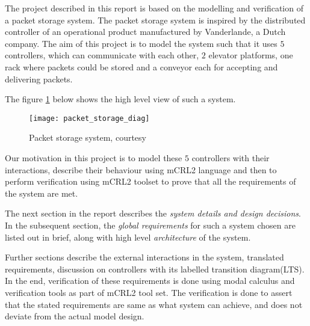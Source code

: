 
The project described in this report is based on the modelling and verification of a packet storage system. The packet storage system is inspired by the distributed controller of an operational product manufactured by Vanderlande, a Dutch company. 
The aim of this project is to model the system such that it uses $5$ controllers, which can communicate with each other, $2$ elevator platforms, one rack where packets could be stored and a conveyor each for accepting and delivering packets.

The figure \ref{fig:packet_storage} below shows the high level view of such a system.
\begin{figure}[h]
\center
\texttt{[image: packet\_storage\_diag]}
\caption{Packet storage system, courtesy \cite{problem_statement}}
\label{fig:packet_storage}
\end{figure}

Our motivation in this project is to model these $5$ controllers with their interactions, describe their behaviour using mCRL2 language and then to perform verification using mCRL2 toolset to prove that all the requirements of the system are met.

The next section in the report describes the \textit{system details and design decisions}. In the subsequent section, the \textit{global requirements} for such a system chosen are listed out in brief, along with high level \textit{architecture} of the system. 

Further sections describe the external interactions in the system, translated requirements, discussion on controllers with its labelled transition diagram(LTS). In the end, verification of these requirements is done using modal calculus and verification tools as part of mCRL2 tool set. The verification is done to assert that the stated requirements are same as what system can achieve, and does not deviate from the actual model design.